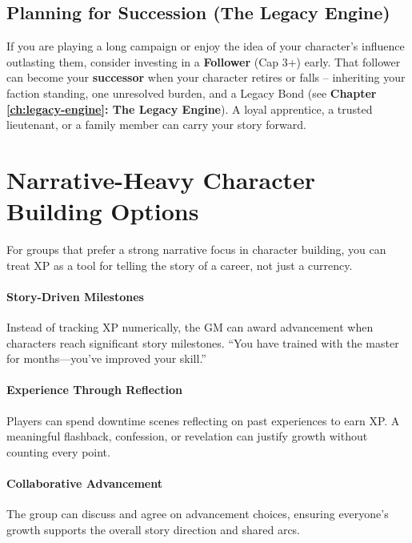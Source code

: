 \subsection*{Planning for Succession (The Legacy Engine)}
If you are playing a long campaign or enjoy the idea of your character's
influence outlasting them, consider investing in a \textbf{Follower} (Cap 3+)
early. That follower can become your \textbf{successor} when your character
retires or falls -- inheriting your faction standing, one unresolved burden, and
a Legacy Bond (see \textbf{Chapter \ref{ch:legacy-engine}: The Legacy Engine}).
A loyal apprentice, a trusted lieutenant, or a family member can carry your
story forward.


\section{Narrative-Heavy Character Building Options}
\label{sec:xp-narrative}

For groups that prefer a strong narrative focus in character building, you can
treat XP as a tool for telling the story of a career, not just a currency.

\paragraph{Story-Driven Milestones}
\label{sec:xp-milestones}
Instead of tracking XP numerically, the GM can award advancement when
characters reach significant story milestones.  
``You have trained with the master for months---you've improved your skill.''

\paragraph{Experience Through Reflection}
\label{sec:xp-reflection}
Players can spend downtime scenes reflecting on past experiences to earn XP.
A meaningful flashback, confession, or revelation can justify growth without
counting every point.

\paragraph{Collaborative Advancement}
\label{sec:xp-collaborative}
The group can discuss and agree on advancement choices, ensuring everyone's
growth supports the overall story direction and shared arcs.

